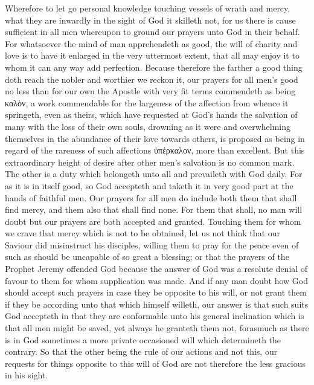 Wherefore to let go personal knowledge touching vessels of wrath and mercy, what they are inwardly in the sight of God it skilleth not, for us there is cause sufficient in all men whereupon to ground our prayers unto God in their behalf. For whatsoever the mind of man apprehendeth as good, the will of charity and love is to have it enlarged in the very uttermost extent, that all may enjoy it to whom it can any way add perfection. Because therefore the farther a good thing doth reach the nobler and worthier we reckon it, our prayers for all men’s good no less than for our own the Apostle with very fit terms commendeth as being καλὸν, a work commendable for the largeness of the affection from whence it springeth, even as theirs, which have requested at God’s hands the salvation of many with the loss of their own souls, drowning as it were and overwhelming themselves in the abundance of their love towards others, is proposed as being in regard of the rareness of such affections ὑπέρκαλον, more than excellent. But this extraordinary height of desire after other men’s salvation is no common mark. The other is a duty which belongeth unto all and prevaileth with God daily. For as it is in itself good, so God accepteth and taketh it in very good part at the hands of faithful men. Our prayers for all men do include both them that shall find mercy, and them also that shall find none. For them that shall, no man will doubt but our prayers are both accepted and granted. Touching them for whom we crave that mercy which is not to be obtained, let us not think that our Saviour did misinstruct his disciples, willing them to pray for the peace even of such as should be uncapable of so great a blessing; or that the prayers of the Prophet Jeremy offended God because the answer of God was a resolute denial of favour to them for whom supplication was made. And if any man doubt how God should accept such prayers in case they be opposite to his will, or not grant them if they be according unto that which himself willeth, our answer is that such suits God accepteth in that they are conformable unto his general  inclination which is that all men might be saved, yet always he granteth them not, forasmuch as there is in God sometimes a more private occasioned will which determineth the contrary. So that the other being the rule of our actions and not this, our requests for things opposite to this will of God are not therefore the less gracious in his sight.
